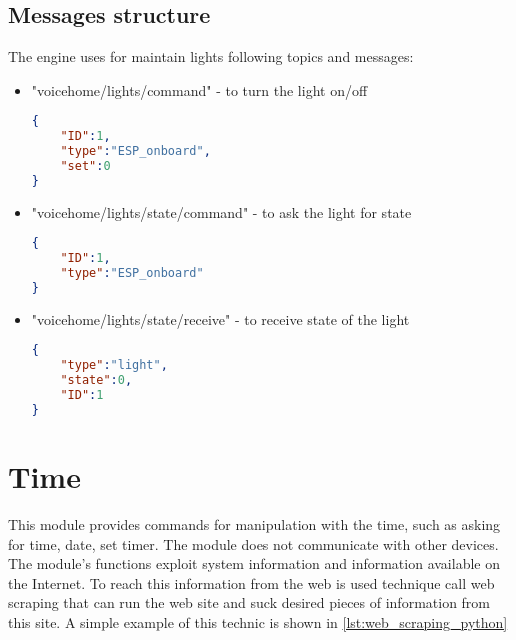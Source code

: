 \subsection{Messages structure}
The engine uses for maintain lights following topics and messages:

\begin{itemize}
    \item "voicehome/lights/command" - to turn the light on/off
    \begin{lstlisting}[language=json,firstnumber=1,caption={Structure of JSON message to turn on/off the light in module \textit{Lights}},captionpos=b,xleftmargin=1cm]
{
    "ID":1,
    "type":"ESP_onboard",
    "set":0
}
    \end{lstlisting}
    \item "voicehome/lights/state/command" - to ask the light for state
    \begin{lstlisting}[language=json,firstnumber=1,caption={Structure of JSON message to asking for the state of the light in module \textit{Lights}},captionpos=b,xleftmargin=1cm]
{
    "ID":1,
    "type":"ESP_onboard"
}
    \end{lstlisting}
    \item "voicehome/lights/state/receive" - to receive state of the light
    \begin{lstlisting}[language=json,firstnumber=1,caption={Structure of JSON message to receive state of the light in module \textit{Lights}},captionpos=b,xleftmargin=1cm]
{
    "type":"light",
    "state":0,
    "ID":1
}
    \end{lstlisting}
\end{itemize}

\section{Time}

This module provides commands for manipulation with the time, such as asking for time, date, set timer. The module does not communicate with other devices. The module's functions exploit system information and information available on the Internet. To reach this information from the web is used technique call web scraping that can run the web site and suck desired pieces of information from this site. A simple example of this technic is shown in \cref{lst:web_scraping_python}


